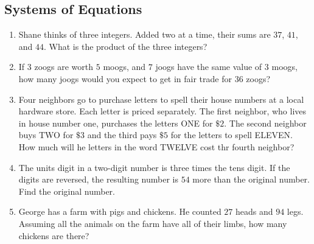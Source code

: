 \documentclass{article}
\begin{document}
    \subsection*{Systems of Equations}
    \begin{enumerate}[resume]
        \item Shane thinks of three integers. Added two at a time, their sums are $37$, $41$, and $44$. What is the product of the three integers?
        \vspace{3cm}
        \item If $3$ zoogs are worth $5$ moogs, and $7$ joogs have the same value of $3$ moogs, how many joogs would you expect to get in fair trade for $36$ zoogs?
        \vspace{3cm}
        \item Four neighbors go to purchase letters to spell their house numbers at a local hardware store. Each letter is priced separately. The first neighbor, who lives in house number one, purchases the letters ONE for $\$2$. The second neighbor buys TWO for $\$3$ and the third pays $\$5$ for the letters to spell ELEVEN. How much will he letters in the word TWELVE cost thr fourth neighbor?
        \vspace{3cm}
        \item The units digit in a two-digit number is three times the tens digit. If the digits are reversed, the resulting number is $54$ more than the original number. Find the original number.
        \vspace{3cm}
        \item George has a farm with pigs and chickens. He counted $27$ heads and $94$ legs. Assuming all the animals on the farm have all of their limbs, how many chickens are there?
        \vspace{3cm}
    \end{enumerate}
\end{document}
